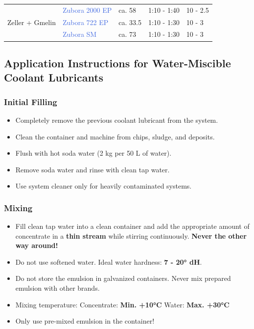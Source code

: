 \begin{longtable}{|p{3.5cm}|p{4.5cm}|p{1.5cm}|p{2.7cm}|p{2cm}|}
    \multirow{3}{*}{Zeller + Gmelin} & \textcolor{RoyalBlue}{Zubora 2000 EP} & ca. 58 & 1:10 - 1:40 & 10 - 2.5 \\
    \cline{2-5}
    & \textcolor{RoyalBlue}{Zubora 722 EP} & ca. 33.5 & 1:10 - 1:30 & 10 - 3 \\
    \cline{2-5}
    & \textcolor{RoyalBlue}{Zubora SM} & ca. 73 & 1:10 - 1:30 & 10 - 3 \\
    \hline
\end{longtable}

\newpage
\subsection*{Application Instructions for Water-Miscible Coolant Lubricants}

\subsubsection*{Initial Filling}
\begin{itemize}
    \item Completely remove the previous coolant lubricant from the system.
    \item Clean the container and machine from chips, sludge, and deposits.
    \item Flush with hot soda water (2 kg per 50 L of water).
    \item Remove soda water and rinse with clean tap water.
    \item Use system cleaner only for heavily contaminated systems.
\end{itemize}

\subsubsection*{Mixing}
\begin{itemize}
    \item Fill clean tap water into a clean container and add the appropriate amount of concentrate in a \textbf{thin stream} while stirring continuously.  
          \textbf{Never the other way around!}
    \item Do not use softened water. Ideal water hardness: \textbf{7 - 20° dH}.
    \item Do not store the emulsion in galvanized containers. Never mix prepared emulsion with other brands.
    \item Mixing temperature:  
          \quad Concentrate: \textbf{Min. +10°C}  
          \quad Water: \textbf{Max. +30°C}
    \item Only use pre-mixed emulsion in the container!
\end{itemize}

